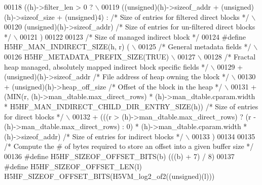 \begin{DoxyCode}
00118 \textcolor{preprocessor}{    ((h)->filter\_len > 0 ?                                                    \(\backslash\)}
00119 \textcolor{preprocessor}{        ((unsigned)(h)->sizeof\_addr + (unsigned)(h)->sizeof\_size + (unsigned)4) : }\textcolor{comment}{/* Size of entries for
       filtered direct blocks */}\textcolor{preprocessor}{ \(\backslash\)}
00120 \textcolor{preprocessor}{        (unsigned)(h)->sizeof\_addr)             }\textcolor{comment}{/* Size of entries for un-filtered direct blocks */}\textcolor{preprocessor}{ \(\backslash\)}
00121 \textcolor{preprocessor}{    )}
00122 
00123 \textcolor{comment}{/* Size of managed indirect block */}
00124 \textcolor{preprocessor}{#define H5HF\_MAN\_INDIRECT\_SIZE(h, r) (                                        \(\backslash\)}
00125 \textcolor{preprocessor}{    }\textcolor{comment}{/* General metadata fields */}\textcolor{preprocessor}{                                             \(\backslash\)}
00126 \textcolor{preprocessor}{    H5HF\_METADATA\_PREFIX\_SIZE(TRUE)                                           \(\backslash\)}
00127 \textcolor{preprocessor}{                                                                              \(\backslash\)}
00128 \textcolor{preprocessor}{    }\textcolor{comment}{/* Fractal heap managed, absolutely mapped indirect block specific fields */}\textcolor{preprocessor}{ \(\backslash\)}
00129 \textcolor{preprocessor}{    + (unsigned)(h)->sizeof\_addr          }\textcolor{comment}{/* File address of heap owning the block */}\textcolor{preprocessor}{   \(\backslash\)}
00130 \textcolor{preprocessor}{    + (unsigned)(h)->heap\_off\_size        }\textcolor{comment}{/* Offset of the block in the heap */}\textcolor{preprocessor}{         \(\backslash\)}
00131 \textcolor{preprocessor}{    + (MIN(r, (h)->man\_dtable.max\_direct\_rows) * (h)->man\_dtable.cparam.width *
       H5HF\_MAN\_INDIRECT\_CHILD\_DIR\_ENTRY\_SIZE(h)) }\textcolor{comment}{/* Size of entries for direct blocks */}\textcolor{preprocessor}{ \(\backslash\)}
00132 \textcolor{preprocessor}{    + (((r > (h)->man\_dtable.max\_direct\_rows) ? (r - (h)->man\_dtable.max\_direct\_rows) : 0)  *
       (h)->man\_dtable.cparam.width * (h)->sizeof\_addr) }\textcolor{comment}{/* Size of entries for indirect blocks */}\textcolor{preprocessor}{ \(\backslash\)}
00133 \textcolor{preprocessor}{    )}
00134 
00135 \textcolor{comment}{/* Compute the # of bytes required to store an offset into a given buffer size */}
00136 \textcolor{preprocessor}{#define H5HF\_SIZEOF\_OFFSET\_BITS(b)   (((b) + 7) / 8)}
00137 \textcolor{preprocessor}{#define H5HF\_SIZEOF\_OFFSET\_LEN(l)   H5HF\_SIZEOF\_OFFSET\_BITS(H5VM\_log2\_of2((unsigned)(l)))}

\end{DoxyCode}
